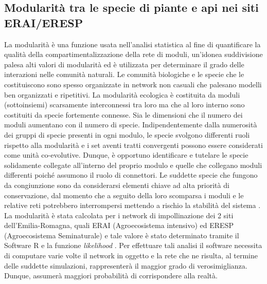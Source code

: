 \documentclass[main.tex]{subfiles}
\begin{document}
\subsection{Modularità tra le specie di piante e api nei siti ERAI/ERESP}\label{Cap. 2.12}

La modularità è una funzione usata nell'analisi statistica al fine di quantificare la qualità della compartimentalizzazione della rete di moduli, un’idonea suddivisione palesa alti valori di modularità ed è utilizzata per determinare il grado delle interazioni nelle comunità naturali.
Le comunità biologiche e le specie che le costituiscono sono spesso organizzate in network non casuali che palesano modelli ben organizzati e ripetitivi. La modularità ecologica è costituita da moduli (sottoinsiemi) scarsamente interconnessi tra loro ma che al loro interno sono costituiti da specie fortemente connesse. Sia le dimensioni che il numero dei moduli aumentano con il numero di specie.
Indipendentemente dalla numerosità dei gruppi di specie presenti in ogni modulo, le specie svolgono differenti ruoli rispetto alla modularità e i set aventi tratti convergenti possono essere considerati come unità co-evolutive. Dunque, è opportuno identificare e tutelare le specie solidamente collegate all'interno del proprio modulo e quelle che collegano moduli differenti poiché assumono il ruolo di connettori. Le suddette specie che fungono da congiunzione sono da considerarsi elementi chiave ad alta priorità di conservazione, dal momento che a seguito della loro scomparsa i moduli e le relative reti potrebbero interrompersi mettendo a rischio la stabilità del sistema \citep{ole}.
La modularità è stata calcolata per i network di impollinazione dei 2 siti dell’Emilia-Romagna, quali ERAI (Agroecosistema intensivo) ed ERESP (Agroecosistema Seminaturale) e tale valore è stato determinato tramite il Software R e la funzione \textit{likelihood} \citep{goffe}.
Per effettuare tali analisi il software necessita di computare varie volte il network in oggetto e la rete che ne risulta, al termine delle suddette simulazioni, rappresenterà il maggior grado di verosimiglianza. Dunque, assumerà maggiori probabilità di corrispondere alla realtà.

\clearpage
\end{document}
